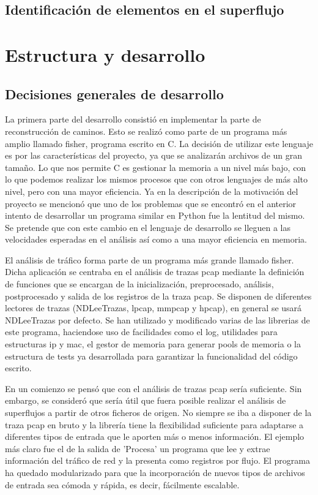 \documentclass[twoside, 12pt]{epstfg}
\begin{document}
\section{Identificación de elementos en el superflujo}

\chapter{Estructura y desarrollo}
\label{chap:Desarrollo}
\section{Decisiones generales de desarrollo}
La primera parte del desarrollo consistió en implementar la parte de reconstrucción de caminos. Esto se realizó como parte de un programa más amplio llamado fisher, programa escrito en C. La decisión de utilizar este lenguaje es por las características del proyecto, ya que se analizarán archivos de un gran tamaño. Lo que nos permite C es gestionar la memoria a un nivel más bajo, con lo que podemos realizar los mismos procesos que con otros lenguajes de más alto nivel, pero con una mayor eficiencia. Ya en la descripción de la motivación del proyecto se mencionó que uno de los problemas que se encontró en el anterior intento de desarrollar un programa similar en Python fue la lentitud del mismo. Se pretende que con este cambio en el lenguaje de desarrollo se lleguen a las velocidades esperadas en el análisis así como a una mayor eficiencia en memoria.

El análisis de tráfico forma parte de un programa más grande llamado fisher. Dicha aplicación se centraba en el análisis de trazas pcap mediante la definición de funciones que se encargan de la inicialización, preprocesado, análisis, postprocesado y salida de los registros de la traza pcap. Se disponen de diferentes lectores de trazas (NDLeeTrazas, lpcap, mmpcap y hpcap), en general se usará NDLeeTrazas por defecto. Se han utilizado y modificado varias de las librerias de este programa, haciendose uso de facilidades como el log, utilidades para estructuras ip y mac, el gestor de memoria para generar pools de memoria o la estructura de tests ya desarrollada para garantizar la funcionalidad del código escrito.

En un comienzo se pensó que con el análisis de trazas pcap sería suficiente. Sin embargo, se consideró que sería útil que fuera posible realizar el análisis de superflujos a partir de otros ficheros de origen. No siempre se iba a disponer de la traza pcap en bruto y la librería tiene la flexibilidad suficiente para adaptarse a diferentes tipos de entrada que le aporten más o menos información. El ejemplo más claro fue el de la salida de 'Procesa' un programa que lee y extrae información del tráfico de red y la presenta como registros por flujo. El programa ha quedado modularizado para que la incorporación de nuevos tipos de archivos de entrada sea cómoda y rápida, es decir, fácilmente escalable. 
\end{document}
